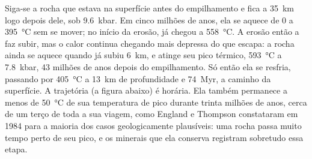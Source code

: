 \begin{omfigure}
\centering
{}
\par{}
\end{omfigure}

Siga-se a rocha que estava na superfície antes do empilhamento e fica a \qty{35}{km} logo
depois dele, sob \qty{9.6}{kbar}. Em cinco milhões de anos, ela se aquece de 0 a
\qty{395}{\celsius} sem se mover; no início da erosão, já chegou a
\qty{558}{\celsius}. A erosão então a faz subir, mas o calor continua chegando mais depressa do que
escapa: a rocha ainda se aquece quando já subiu \qty{6}{km}, e atinge seu pico
térmico, \qty{593}{\celsius} a \qty{7.8}{kbar}, 43 milhões de anos depois do empilhamento. Só
então ela se resfria, passando por \qty{405}{\celsius} a \qty{13}{km} de profundidade e
\qty{74}{Myr}, a caminho da superfície. A trajetória (a figura abaixo) é horária. Ela também
permanece a menos de \qty{50}{\celsius} de sua temperatura de pico durante trinta milhões de anos, cerca de um
terço de toda a sua viagem, como England e Thompson constataram em 1984 para a maioria dos casos
geologicamente plausíveis: uma rocha passa muito tempo perto de seu pico, e os minerais que ela conserva
registram sobretudo essa etapa.

